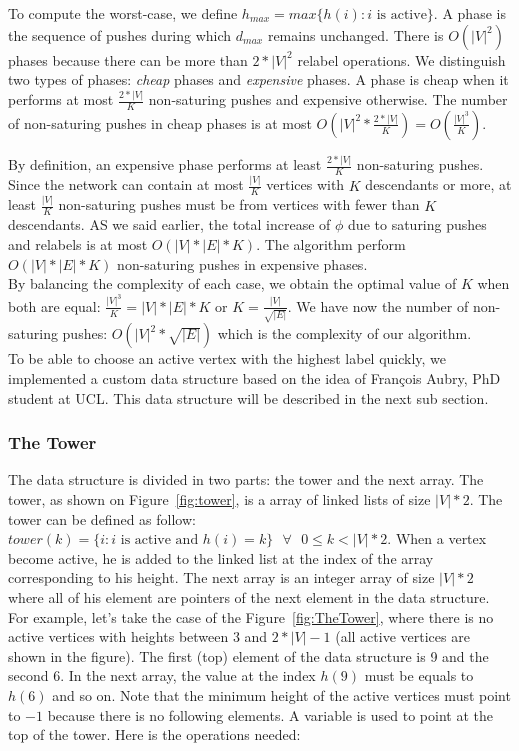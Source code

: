 To compute the worst-case, we define $h_{max} = max\{h(i) : i\text{ is active}\}$. A phase is the sequence of pushes during which $d_{max}$ remains unchanged. There is $O(|V|^2)$ phases because there can be more than $2*|V|^2$ relabel operations. We distinguish two types of phases: \textit{cheap} phases and \textit{expensive} phases. A phase is cheap when it performs at most $\frac{2*|V|}{K}$ non-saturing pushes and expensive otherwise. The number of non-saturing pushes in cheap phases is at most $O(|V|^2 * \frac{2*|V|}{K}) = O(\frac{|V|^3}{K})$.

By definition, an expensive phase performs at least $\frac{2*|V|}{K}$ non-saturing pushes. Since the network can contain at most $\frac{|V|}{K}$ vertices with $K$ descendants or more, at least $\frac{|V|}{K}$ non-saturing pushes must be from vertices with fewer than $K$ descendants. AS we said earlier, the total increase of $\phi$ due to saturing pushes and relabels is at most $O(|V|*|E|*K)$. The algorithm perform $O(|V|*|E|*K)$ non-saturing pushes in expensive phases.\\

By balancing the complexity of each case, we obtain the optimal value of $K$ when both are equal: $\frac{|V|^3}{K} = |V|*|E|*K$ or $K = \frac{|V|}{\sqrt{|E|}}$. We have now the number of non-saturing pushes: $O(|V|^2*\sqrt{|E|})$ which is the complexity of our algorithm.\\


To be able to choose an active vertex with the highest label quickly, we implemented a custom data structure based on the idea of Fran\c cois Aubry, PhD student at UCL. This data structure will be described in the next sub section.

\subsubsection{The Tower}

The data structure is divided in two parts: the tower and the next array. The tower, as shown on Figure~\ref{fig:tower}, is a array of linked lists of size $|V|*2$. The tower can be defined as follow: $tower(k) = \{i : i \text{ is active and } h(i) = k\} \text{ } \forall \text{ } 0 \le k < |V|*2$. When a vertex become active, he is added to the linked list at the index of the array corresponding to his height. The next array is an integer array of size $|V|*2$ where all of his element are pointers of the next element in the data structure. For example, let's take the case of the Figure~\ref{fig:TheTower}, where there is no active vertices with heights between 3 and $2*|V|-1$ (all active vertices are shown in the figure). The first (top) element of the data structure is 9 and the second 6. In the next array, the value at the index $h(9)$ must be equals to $h(6)$ and so on. Note that the minimum height of the active vertices must point to $-1$ because there is no following elements. A variable is used to point at the top of the tower. Here is the operations needed:

